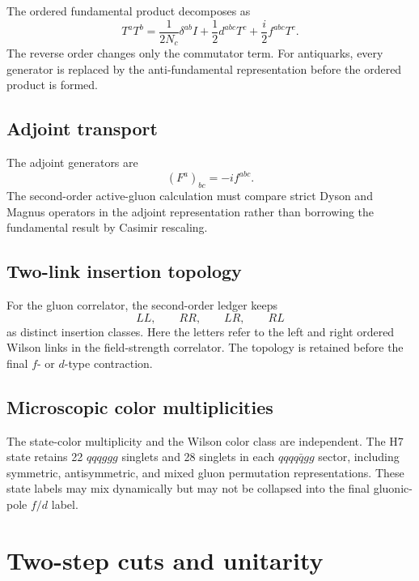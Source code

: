\documentclass[11pt]{article}
\begin{document}
The ordered fundamental product decomposes as
\begin{equation}
 T^aT^b
 =\frac{1}{2N_c}\delta^{ab}I
 +\frac12d^{abc}T^c
 +\frac{i}{2}f^{abc}T^c.
 \label{eq:TaTb}
\end{equation}
The reverse order changes only the commutator term.  For antiquarks, every
generator is replaced by the anti-fundamental representation before the
ordered product is formed.

\subsection{Adjoint transport}

The adjoint generators are
\begin{equation}
 (F^a)_{bc}=-if^{abc}.
 \label{eq:adjoint-generators}
\end{equation}
The second-order active-gluon calculation must compare strict Dyson and Magnus
operators in the adjoint representation rather than borrowing the
fundamental result by Casimir rescaling.

\subsection{Two-link insertion topology}

For the gluon correlator, the second-order ledger keeps
\begin{equation}
 LL,
 \qquad RR,
 \qquad LR,
 \qquad RL
 \label{eq:two-link-topologies}
\end{equation}
as distinct insertion classes.  Here the letters refer to the left and right
ordered Wilson links in the field-strength correlator.  The topology is
retained before the final \(f\)- or \(d\)-type contraction.

\subsection{Microscopic color multiplicities}

The state-color multiplicity and the Wilson color class are independent.  The
H7 state retains 22 \(qqqggg\) singlets and 28 singlets in each
\(qqqq\bar qgg\) sector, including symmetric, antisymmetric, and mixed gluon
permutation representations.  These state labels may mix dynamically but may
not be collapsed into the final gluonic-pole \(f/d\) label.

\section{Two-step cuts and unitarity}
\label{sec:cuts2}
\end{document}
